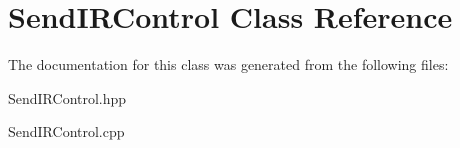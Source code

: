 \hypertarget{class_send_i_r_control}{}\section{Send\+I\+R\+Control Class Reference}
\label{class_send_i_r_control}


The documentation for this class was generated from the following files\+:\begin{DoxyCompactItemize}
\item 
Send\+I\+R\+Control.\+hpp\item 
Send\+I\+R\+Control.\+cpp\end{DoxyCompactItemize}

